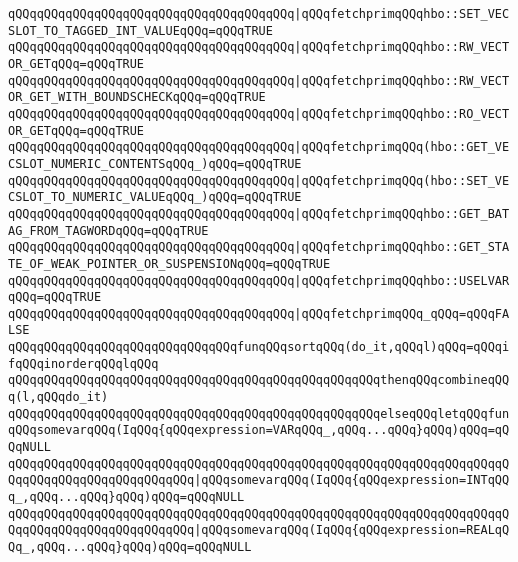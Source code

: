 \verb|qQQqqQQqqQQqqQQqqQQqqQQqqQQqqQQqqQQqqQQq|\verb#|qQQqfetchprimqQQqhbo::SET_VECSLOT_TO_TAGGED_INT_VALUEqQQq=qQQqTRUE#\newline
\newline
\verb|qQQqqQQqqQQqqQQqqQQqqQQqqQQqqQQqqQQqqQQq|\verb#|qQQqfetchprimqQQqhbo::RW_VECTOR_GETqQQq=qQQqTRUE#\newline
\verb|qQQqqQQqqQQqqQQqqQQqqQQqqQQqqQQqqQQqqQQq|\verb#|qQQqfetchprimqQQqhbo::RW_VECTOR_GET_WITH_BOUNDSCHECKqQQq=qQQqTRUE#\newline
\verb|qQQqqQQqqQQqqQQqqQQqqQQqqQQqqQQqqQQqqQQq|\verb#|qQQqfetchprimqQQqhbo::RO_VECTOR_GETqQQq=qQQqTRUE#\newline
\newline
\verb|qQQqqQQqqQQqqQQqqQQqqQQqqQQqqQQqqQQqqQQq|\verb#|qQQqfetchprimqQQq(hbo::GET_VECSLOT_NUMERIC_CONTENTSqQQq_)qQQq=qQQqTRUE#\newline
\verb|qQQqqQQqqQQqqQQqqQQqqQQqqQQqqQQqqQQqqQQq|\verb#|qQQqfetchprimqQQq(hbo::SET_VECSLOT_TO_NUMERIC_VALUEqQQq_)qQQq=qQQqTRUE#\newline
\verb|qQQqqQQqqQQqqQQqqQQqqQQqqQQqqQQqqQQqqQQq|\verb#|qQQqfetchprimqQQqhbo::GET_BATAG_FROM_TAGWORDqQQq=qQQqTRUE#\newline
\verb|qQQqqQQqqQQqqQQqqQQqqQQqqQQqqQQqqQQqqQQq|\verb#|qQQqfetchprimqQQqhbo::GET_STATE_OF_WEAK_POINTER_OR_SUSPENSIONqQQq=qQQqTRUE#\newline
\verb|qQQqqQQqqQQqqQQqqQQqqQQqqQQqqQQqqQQqqQQq|\verb#|qQQqfetchprimqQQqhbo::USELVARqQQq=qQQqTRUE#\newline
\verb|qQQqqQQqqQQqqQQqqQQqqQQqqQQqqQQqqQQqqQQq|\verb#|qQQqfetchprimqQQq_qQQq=qQQqFALSE#\newline
\newline
\newline
\verb|qQQqqQQqqQQqqQQqqQQqqQQqqQQqqQQqfunqQQqsortqQQq(do_it,qQQql)qQQq=qQQqifqQQqinorderqQQqlqQQq|\newline
\verb|qQQqqQQqqQQqqQQqqQQqqQQqqQQqqQQqqQQqqQQqqQQqqQQqqQQqthenqQQqcombineqQQq(l,qQQqdo_it)|\newline
\verb|qQQqqQQqqQQqqQQqqQQqqQQqqQQqqQQqqQQqqQQqqQQqqQQqqQQqelseqQQqletqQQqfunqQQqsomevarqQQq(IqQQq{qQQqexpression=VARqQQq_,qQQq...qQQq}qQQq)qQQq=qQQqNULL|\newline
\verb|qQQqqQQqqQQqqQQqqQQqqQQqqQQqqQQqqQQqqQQqqQQqqQQqqQQqqQQqqQQqqQQqqQQqqQQqqQQqqQQqqQQqqQQqqQQqqQQq|\verb#|qQQqsomevarqQQq(IqQQq{qQQqexpression=INTqQQq_,qQQq...qQQq}qQQq)qQQq=qQQqNULL#\newline
\verb|qQQqqQQqqQQqqQQqqQQqqQQqqQQqqQQqqQQqqQQqqQQqqQQqqQQqqQQqqQQqqQQqqQQqqQQqqQQqqQQqqQQqqQQqqQQqqQQq|\verb#|qQQqsomevarqQQq(IqQQq{qQQqexpression=REALqQQq_,qQQq...qQQq}qQQq)qQQq=qQQqNULL#\newline
